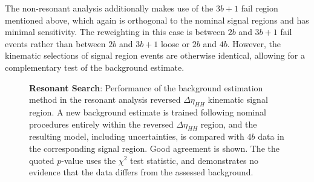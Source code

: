 The non-resonant analysis additionally makes use of the $3b+1$ fail region mentioned 
above, which again is orthogonal to the nominal signal regions and has minimal sensitivity.
The reweighting in this case is between $2b$ and $3b+1$ fail events rather than between 
$2b$ and $3b+1$ loose or $2b$ and $4b$. However, the kinematic selections of signal 
region events are otherwise identical, allowing for a complementary test of the 
background estimate.


\begin{figure}[ht]
	\centering
	\caption{\label{fig:res-rev-deta} \textbf{Resonant Search}: Performance of the background estimation method in the 
	resonant analysis reversed $\Delta \eta_{HH}$ kinematic signal region. A new background estimate is trained 
	following nominal procedures entirely within the reversed $\Delta \eta_{HH}$ region, and the resulting model, 
	including uncertainties, is compared with $4b$ data in the corresponding signal region. Good agreement is shown. The 
	the quoted $p$-value uses the $\chi^{2}$ test statistic, and demonstrates no evidence that the data differs from the 
	assessed background.}
\end{figure}

